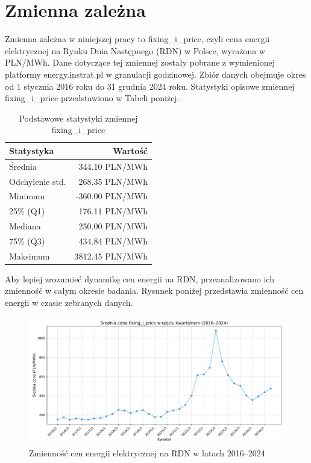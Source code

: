 \section{Zmienna zależna}
Zmienna zależna w niniejszej pracy to fixing\_i\_price, czyli cena energii elektrycznej na Rynku Dnia Następnego (RDN) w Polsce, wyrażona w PLN/MWh. Dane dotyczące tej zmiennej zostały pobrane z wymienionej platformy energy.instrat.pl w granulacji godzinowej. Zbiór danych obejmuje okres od 1 stycznia 2016 roku do 31 grudnia 2024 roku. Statystyki opisowe zmiennej fixing\_i\_price przedstawiono w Tabeli poniżej. 
\begin{table}[H]
    \centering
    \begin{tabular}{|l|r|}
    \hline
    \textbf{Statystyka} & \textbf{Wartość} \\ \hline
    Średnia             & 344.10 PLN/MWh   \\ \hline
    Odchylenie std.     & 268.35 PLN/MWh   \\ \hline
    Minimum             & -360.00 PLN/MWh  \\ \hline
    25\% (Q1)           & 176.11 PLN/MWh   \\ \hline
    Mediana             & 250.00 PLN/MWh   \\ \hline
    75\% (Q3)           & 434.84 PLN/MWh   \\ \hline
    Maksimum            & 3812.45 PLN/MWh  \\ \hline
    \end{tabular}
    \caption{Podstawowe statystyki zmiennej fixing\_i\_price}
    \label{tab:fixing-i-price-stats}
\end{table}

Aby lepiej zrozumieć dynamikę cen energii na RDN, przeanalizowano ich zmienność w całym okresie badania. Rysunek poniżej przedstawia zmienność cen energii w czasie zebranych danych.

\begin{figure}[H]
    \centering
    \includegraphics[width=\textwidth]{../plots/data/quarterly_fixing_i_price.png}
    \caption{Zmienność cen energii elektrycznej na RDN w latach 2016–2024}
    \label{fig:fixing-i-price-trend}
\end{figure}

